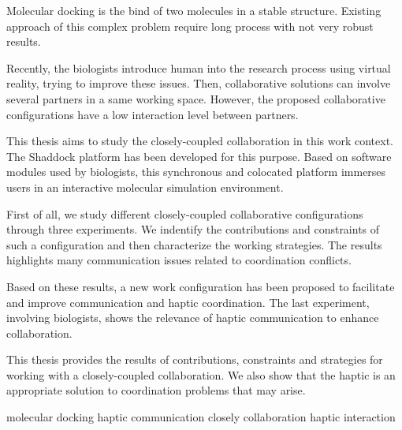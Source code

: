 \documentclass[myfrancais,ngerman,english,french]{mythesis}
\begin{document}
	\begin{myabstract}[english]
		Molecular docking is the bind of two molecules in a stable structure.
		Existing approach of this complex problem require long process with not very robust results.

		Recently, the biologists introduce human into the research process using virtual reality, trying to improve these issues.
		Then, collaborative solutions can involve several partners in a same working space.
		However, the proposed collaborative configurations have a low interaction level between partners.

		This thesis aims to study the closely-coupled collaboration in this work context.
		The Shaddock platform has been developed for this purpose.
		Based on software modules used by biologists, this synchronous and colocated platform immerses users in an interactive molecular simulation environment.

		First of all, we study different closely-coupled collaborative configurations through three experiments.
		We indentify the contributions and constraints of such a configuration and then characterize the working strategies.
		The results highlights many communication issues related to coordination conflicts.

		Based on these results, a new work configuration has been proposed to facilitate and improve communication and haptic coordination.
		The last experiment, involving biologists, shows the relevance of haptic communication to enhance collaboration.

		This thesis provides the results of contributions, constraints and strategies for working with a closely-coupled collaboration.
		We also show that the haptic is an appropriate solution to coordination problems that may arise.
		\begin{mykeywords}
			\mykeyword molecular docking
			\mykeyword haptic communication
			\mykeyword closely collaboration
			\mykeyword haptic interaction
		\end{mykeywords}
	\end{myabstract}
	\mainmatter
\end{document}
